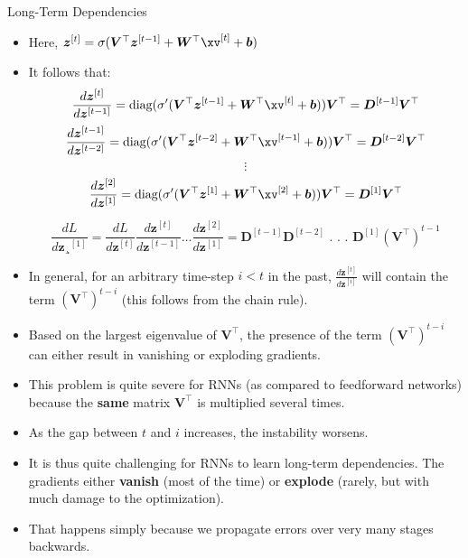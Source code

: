 \begin{vbframe}{Long-Term Dependencies}
  
  \begin{itemize}
    \item Here, $\bm{z}^{[t]} = \sigma(\bm{V}^\top \bm{z}^{[t-1]} + \bm{W}^\top \xv^{[t]} + \bm{b})$
    \item It follows that:
    $$ \frac{d \bm{z}^{[t]}}{d\bm{z}^{[t-1]}} = \text{diag}(\sigma' (\bm{V}^\top \bm{z}^{[t-1]} + \bm{W}^\top \xv^{[t]} + \bm{b})) \bm{V}^\top = \bm{D}^{[t-1]} \bm{V}^\top $$
    $$ \frac{d \bm{z}^{[t-1]}}{d\bm{z}^{[t-2]}} = \text{diag}(\sigma' (\bm{V}^\top \bm{z}^{[t-2]} + \bm{W}^\top \xv^{[t-1]} + \bm{b})) \bm{V}^\top= \bm{D}^{[t-2]} \bm{V}^\top $$
    $$ \vdots $$
    $$ \frac{d \bm{z}^{[2]}}{d\bm{z}^{[1]}} = \text{diag}(\sigma' (\bm{V}^\top \bm{z}^{[1]} + \bm{W}^\top \xv^{[2]} + \bm{b})) \bm{V}^\top = \bm{D}^{[1]} \bm{V}^\top $$
    
    $$ \frac{d L}{d \bm{z}¸^{[1]}} = \frac{d L}{d \bm{z}^{[t]}} \frac{d \bm{z}^{[t]}}{d \bm{z}^{[t-1]}} \dots \frac{d \bm{z}^{[2]}}{d \bm{z}^{[1]}} = \bm{D}^{[t-1]} \bm{D}^{[t-2]}   \text{ . . . } \bm{D}^{[1]} (\bm{V}^\top)^{t-1}$$
    \item In general, for an arbitrary time-step $i<t$ in the past, $\frac{d\bm{z}^{[t]}}{d\bm{z}^{[i]}}$ will contain the term $(\bm{V}^\top)^{t-i}$ (this follows from the chain rule).
    \item Based on the largest eigenvalue of $\bm{V}^\top$, the presence of the term $(\bm{V}^\top)^{t-i}$ can either result in vanishing or exploding gradients.
    \item This problem is quite severe for RNNs (as compared to feedforward networks) because the \textbf{same} matrix $\bm{V}^\top$ is multiplied several times. \href{https://tinyurl.com/vangrad}{}
    \item As the gap between $t$ and $i$ increases, the instability worsens.
    \item It is thus quite challenging for RNNs to learn long-term dependencies. The gradients either \textbf{vanish} (most of the time) or \textbf{explode} (rarely, but with much damage to the optimization).
    \item That happens simply because we propagate errors over very many stages backwards.
  \end{itemize}
  

\end{vbframe}
